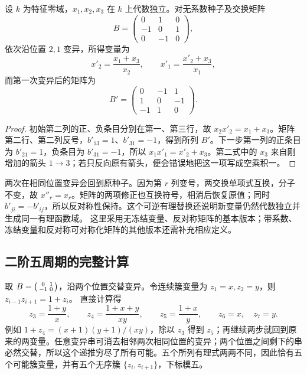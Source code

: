 \begin{proposition}\label{b5:prop:B-three-vertex-mutations}
	设 \(k\) 为特征零域，\(x_1,x_2,x_3\) 在 \(k\) 上代数独立。对无系数种子及交换矩阵
	\[
		B=\begin{pmatrix}0&1&0\\-1&0&1\\0&-1&0\end{pmatrix},
	\]
	依次沿位置 \(2,1\) 变异，所得变量为
	\[
		x'_2=\frac{x_1+x_3}{x_2},\qquad x'_1=\frac{x'_2+x_3}{x_1},
	\]
	而第一次变异后的矩阵为
	\[
		B'=\begin{pmatrix}0&-1&1\\1&0&-1\\-1&1&0\end{pmatrix}.
	\]
\end{proposition}
\begin{proof}
	初始第二列的正、负条目分别在第一、第三行，故 \(x_2x'_2=x_1+x_3\)。矩阵第二行、第二列反号，\(b'_{13}=1\)、\(b'_{31}=-1\)，得到所列 \(B'\)。下一步第一列的正条目为 \(b'_{21}=1\)，负条目为 \(b'_{31}=-1\)，所以 \(x_1x'_1=x'_2+x_3\)。第二式中的 \(x_3\) 来自刚增加的箭头 \(1\to3\)；若只反向原有箭头，便会错误地把这一项写成空乘积一。
\end{proof}
\ProseParagraphBreak
两次在相同位置变异会回到原种子。因为第 \(r\) 列变号，两交换单项式互换，分子不变，故 \(x''_r=x_r\)。矩阵的两项修正也互换符号，相消后恢复原值；同时 \(b'_{ji}=-b'_{ij}\)，所以反对称性保持。这个可逆有理替换还说明新变量仍然代数独立并生成同一有理函数域。 这里采用无冻结变量、反对称矩阵的基本版本；带系数、冻结变量和反对称可对称化矩阵的其他版本还需补充相应定义。

\subsection{二阶五周期的完整计算}
\label{b5:subsec:B02:02}

取 \(B=\begin{psmallmatrix}0&1\\-1&0\end{psmallmatrix}\)，沿两个位置交替变异。令连续簇变量为 \(z_1=x,z_2=y\)，则
\(z_{i-1}z_{i+1}=1+z_i\)。 直接计算得
\[
	z_3=\frac{1+y}{x},\qquad z_4=\frac{1+x+y}{xy},\qquad z_5=\frac{1+x}{y},\qquad z_6=x,\quad z_7=y.
\]
例如 \(1+z_4=(x+1)(y+1)/(xy)\)，除以 \(z_3\) 得到 \(z_5\)；再继续两步就回到原来的两变量。任意变异串可消去相邻两次相同位置的变异；两个位置之间剩下的串必然交替，所以这个递推穷尽了所有可能。五个所列有理式两两不同，因此恰有五个可能簇变量，并有五个无序簇 \(\{z_i,z_{i+1}\}\)，下标模五。

